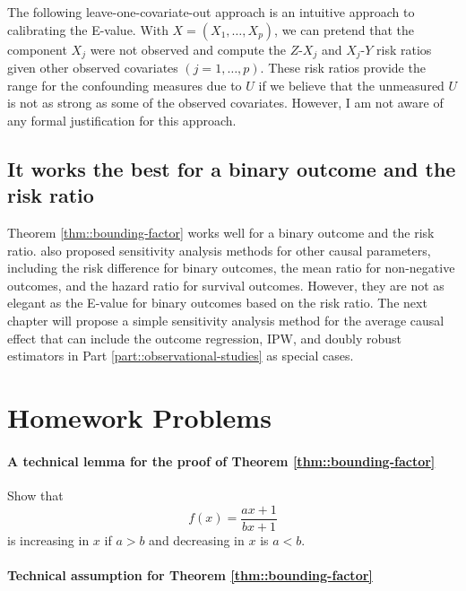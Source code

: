 The following leave-one-covariate-out approach is an intuitive approach to calibrating the E-value. With $X = (X_1, \ldots, X_p)$, we can pretend that the component $X_j$ were not observed and compute the $Z$-$X_j$ and $X_j$-$Y$ risk ratios given other observed covariates $(j=1, \ldots, p)$. These risk ratios provide the range for the confounding measures due to $U$ if we believe that the unmeasured $U$ is not as strong as some of the observed covariates. However, I am not aware of any formal justification for this approach. 



\subsection{It works the best for  a binary outcome and the risk ratio}


Theorem \ref{thm::bounding-factor} works well for a binary outcome and the risk ratio.  \citet{ding2016sensitivity} also proposed sensitivity analysis methods for other causal parameters, including the risk difference for binary outcomes, the mean ratio for non-negative outcomes, and the hazard ratio for survival outcomes. However, they are not as elegant as the E-value for binary outcomes based on the risk ratio. The next chapter will propose a simple sensitivity analysis method for the average causal effect that can include the outcome regression, IPW, and doubly robust estimators in Part \ref{part::observational-studies} as special cases. 





\section{Homework Problems}


\paragraph{A technical lemma for the proof of Theorem \ref{thm::bounding-factor}}
\label{hw::technical-for-evalue-increasing}

Show that 
$$
f(x) = \frac{ax+1}{bx+1}
$$
is increasing in $x$ if $a>b$ and decreasing in $x$ is $a<b$. 


\paragraph{Technical assumption for Theorem \ref{thm::bounding-factor}}
\label{hw::technical-largerthan1}

